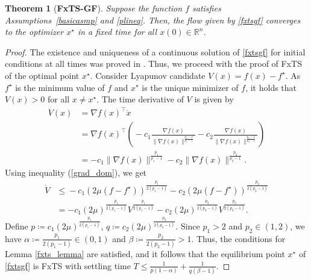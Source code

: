\documentclass[letterpaper]{article}
\newtheorem{theorem}{Theorem}
\begin{document}
\begin{theorem}[\textbf{FxTS-GF}]\label{lemma:fxts_V}
Suppose the function $f$ satisfies Assumptions~\ref{basicasmp} and \ref{plineq}. Then, the flow given by \eqref{fxtsgf} converges to the optimizer $x^\star$ in a fixed time for all $x(0)\in \mathbb R^n$.
\end{theorem}
\begin{proof}
The existence and uniqueness of a continuous solution of \eqref{fxtsgf} for initial conditions at all times was proved in \cite[Proposition 1]{kunal2021}. Thus, we proceed with the proof of FxTS of the optimal point $x^\star$. Consider Lyapunov candidate $V(x)=f(x)-f^\star$. As $f^\star$ is the minimum value of $f$ and $x^\star$ is the unique minimizer of $f$, it holds that $V(x)> 0$ for all $x\neq x^\star$. The time derivative of $V$ is given by
\begin{align*}
\dot{V}(x)&=\nabla f(x)^\intercal  \dot{x} \\
&= \nabla f(x)^\intercal \left(\!-c_1\frac{\nabla f(x)}{\|\nabla f(x)\|^{\frac{p_1-2}{p_1-1}}} -c_2\frac{\nabla f(x)}{\|\nabla f(x)\|^{\frac{p_2-2}{p_2-1}}}\!\right) \\
&= -c_1 \|\nabla f(x)\|^{\frac{p_1}{p_1 -1}} -c_2 \|\nabla f(x)\|^{\frac{p_2}{p_2 -1}}.
\end{align*}
Using inequality (\ref{grad_dom}), we get
\begin{align*}
\dot{V} &\leq \!-c_1(2\mu(f\!-\!f^\star))^{\frac{p_1}{2(p_1\!-\!1)}}\!-\!c_2(2\mu(f\!-\!f^\star))^{\frac{p_2}{2(p_2\!-\!1)}} \\
&= -c_1\!(2\mu)^{\frac{p_1}{2(p_1-1)}}V^{\frac{p_1}{2(p_1-1)}}\!-\!c_2(2\mu)^{\frac{p_2}{2(p_2-1)}} V^{\frac{p_2}{2(p_2-1)}}.
\end{align*}
Define $p\coloneqq c_1 (2\mu)^{\frac{p_1}{2(p_1-1)}}$, $q\coloneqq c_2 (2\mu)^{\frac{p_2}{2(p_2-1)}}$. Since $p_1>2$ and $p_2\in (1,2)$, we have $\alpha\coloneqq\frac{p_1}{2(p_1-1)} \in (0,1)$ and $\beta\coloneqq\frac{p_2}{2(p_2-1)} > 1$. Thus, the conditions for Lemma \ref{fxts_lemma} are satisfied, and it follows that the equilibrium point $x^\star$ of \eqref{fxtsgf} is FxTS with settling time $T\leq \frac{1}{p(1-\alpha)} + \frac{1}{q(\beta -1)}$.
\end{proof}
\end{document}
